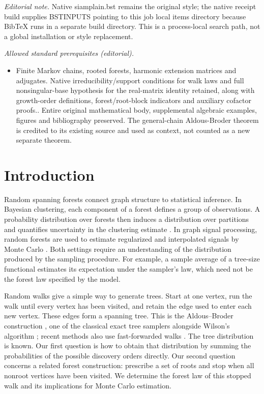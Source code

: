 \documentclass[onefignum,onetabnum,nohypdvips]{siamart250211}
\numberwithin{theorem}{section}
\numberwithin{equation}{section}
\begin{document}
\noindent\textit{Editorial note.} Native siamplain.bst remains the original style; the native receipt build supplies BSTINPUTS pointing to this job local items directory because BibTeX runs in a separate build directory. This is a process-local search path, not a global installation or style replacement.\par\medskip
\noindent\textit{Allowed standard prerequisites (editorial).}\begin{itemize}
\item Finite Markov chains, rooted forests, harmonic extension matrices and adjugates. Native irreducibility/support conditions for walk laws and full nonsingular-base hypothesis for the real-matrix identity retained, along with growth-order definitions, forest/root-block indicators and auxiliary cofactor proofs.. Entire original mathematical body, supplemental algebraic examples, figures and bibliography preserved. The general-chain Aldous-Broder theorem is credited to its existing source and used as context, not counted as a new separate theorem.
\end{itemize}\medskip
\section{Introduction}\label{sec:intro}

Random spanning forests connect graph structure to statistical
inference. In Bayesian clustering, each component of a forest defines
a group of observations. A probability distribution over forests then
induces a distribution over partitions and quantifies uncertainty in
the clustering estimate \cite{LuoSangMallick2021,DuanRoy2024}. In graph
signal processing, random forests are used to estimate regularized and
interpolated signals by Monte Carlo
\cite{PilavciAmblardBarthelmeTremblay2021}. Both settings require an
understanding of the distribution produced by the sampling procedure.
For example, a sample average of a tree-size functional estimates its
expectation under the sampler's law, which need not be the forest law
specified by the model.

Random walks give a simple way to generate trees. Start at one vertex,
run the walk until every vertex has been visited, and retain the edge
used to enter each new vertex. These edges form a spanning tree. This
is the Aldous--Broder construction \cite{Broder1989,Aldous1990}, one of
the classical exact tree samplers alongside Wilson's algorithm
\cite{Wilson1996,ProppWilson1998}; recent methods also use
fast-forwarded walks \cite{TamDunsonDuan2025}. The tree distribution is
known. Our first question is how to obtain that distribution by
summing the probabilities of the possible discovery orders directly.
Our second question concerns a related forest construction: prescribe
a set of roots and stop when all nonroot vertices have been visited.
We determine the forest law of this stopped walk and its implications
for Monte Carlo estimation.
\end{document}
